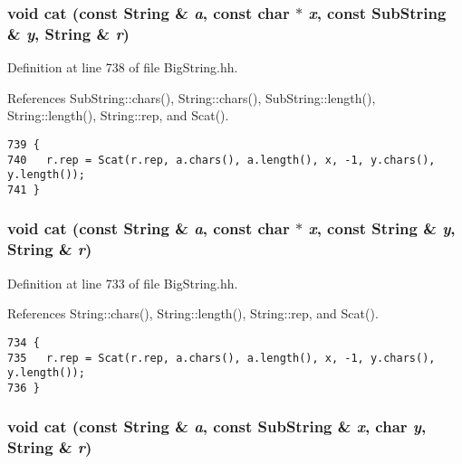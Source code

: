 \subsubsection{\setlength{\rightskip}{0pt plus 5cm}void cat (const {\bf String} \& {\em a}, const char $\ast$ {\em x}, const {\bf Sub\-String} \& {\em y}, {\bf String} \& {\em r})\hspace{0.3cm}{\tt  [inline]}}\label{BigString_8hh_a55}




Definition at line 738 of file Big\-String.hh.

References Sub\-String::chars(), String::chars(), Sub\-String::length(), String::length(), String::rep, and Scat().



\footnotesize\begin{verbatim}739 {
740   r.rep = Scat(r.rep, a.chars(), a.length(), x, -1, y.chars(), y.length());
741 }
\end{verbatim}\normalsize 
{}
\subsubsection{\setlength{\rightskip}{0pt plus 5cm}void cat (const {\bf String} \& {\em a}, const char $\ast$ {\em x}, const {\bf String} \& {\em y}, {\bf String} \& {\em r})\hspace{0.3cm}{\tt  [inline]}}\label{BigString_8hh_a54}




Definition at line 733 of file Big\-String.hh.

References String::chars(), String::length(), String::rep, and Scat().



\footnotesize\begin{verbatim}734 {
735   r.rep = Scat(r.rep, a.chars(), a.length(), x, -1, y.chars(), y.length());
736 }
\end{verbatim}\normalsize 
{}
\subsubsection{\setlength{\rightskip}{0pt plus 5cm}void cat (const {\bf String} \& {\em a}, const {\bf Sub\-String} \& {\em x}, char {\em y}, {\bf String} \& {\em r})\hspace{0.3cm}{\tt  [inline]}}\label{BigString_8hh_a53}




